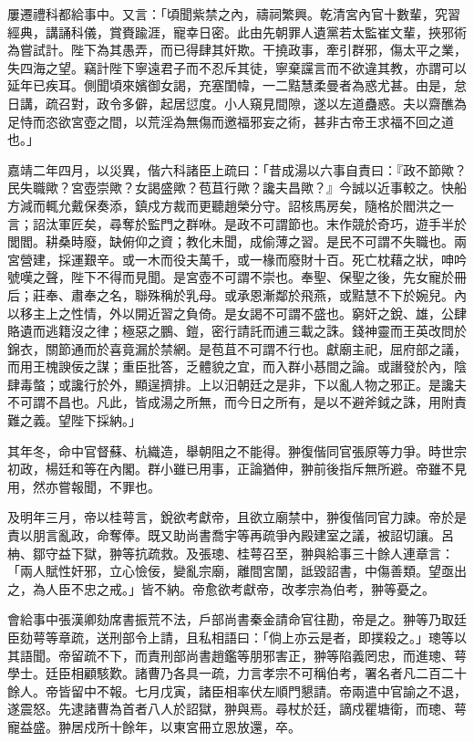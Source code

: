 \begin{pinyinscope}
屢遷禮科都給事中。又言：「頃聞紫禁之內，禱祠繁興。乾清宮內官十數輩，究習經典，講誦科儀，賞賚踰涯，寵幸日密。此由先朝罪人遺黨若太監崔文輩，挾邪術為嘗試計。陛下為其愚弄，而已得肆其奸欺。干撓政事，牽引群邪，傷太平之業，失四海之望。竊計陛下寧遠君子而不忍斥其徒，寧棄讜言而不欲違其教，亦謂可以延年已疾耳。側聞頃來嬪御女謁，充塞閨幃，一二黠慧柔曼者為惑尤甚。由是，怠日講，疏召對，政令多僻，起居愆度。小人窺見間隙，遂以左道蠱惑。夫以齋醮為足恃而恣欲宮壺之間，以荒淫為無傷而邀福邪妄之術，甚非古帝王求福不回之道也。」

嘉靖二年四月，以災異，偕六科諸臣上疏曰：「昔成湯以六事自責曰：『政不節歟？民失職歟？宮壺崇歟？女謁盛歟？苞苴行歟？讒夫昌歟？』今誠以近事較之。快船方減而輒允戴保奏添，鎮戍方裁而更聽趙榮分守。詔核馬房矣，隨格於閻洪之一言；詔汰軍匠矣，尋奪於監門之群咻。是政不可謂節也。末作競於奇巧，遊手半於閭閻。耕桑時廢，缺俯仰之資；教化未聞，成偷薄之習。是民不可謂不失職也。兩宮營建，採運艱辛。或一木而役夫萬千，或一椽而廢財十百。死亡枕藉之狀，呻吟號嘆之聲，陛下不得而見聞。是宮壺不可謂不崇也。奉聖、保聖之後，先女寵於冊后；莊奉、肅奉之名，聯殊稱於乳母。或承恩漸鄰於飛燕，或黠慧不下於婉兒。內以移主上之性情，外以開近習之負倚。是女謁不可謂不盛也。窮奸之銳、雄，公肆賂遺而逃籍沒之律；極惡之鵬、鎧，密行請託而逋三載之誅。錢神靈而王英改問於錦衣，關節通而於喜竟漏於禁網。是苞苴不可謂不行也。獻廟主祀，屈府部之議，而用王槐諛佞之謀；重臣批答，乏體貌之宜，而入群小惎間之論。或譖發於內，陰肆毒螫；或讒行於外，顯逞擠排。上以汨朝廷之是非，下以亂人物之邪正。是讒夫不可謂不昌也。凡此，皆成湯之所無，而今日之所有，是以不避斧鉞之誅，用附責難之義。望陛下採納。」

其年冬，命中官督蘇、杭織造，舉朝阻之不能得。翀復偕同官張原等力爭。時世宗初政，楊廷和等在內閣。群小雖已用事，正論猶伸，翀前後指斥無所避。帝雖不見用，然亦嘗報聞，不罪也。

及明年三月，帝以桂萼言，銳欲考獻帝，且欲立廟禁中，翀復偕同官力諫。帝於是責以朋言亂政，命奪俸。既又助尚書喬宇等再疏爭內殿建室之議，被詔切讓。呂柟、鄒守益下獄，翀等抗疏救。及張璁、桂萼召至，翀與給事三十餘人連章言：「兩人賦性奸邪，立心憸佞，變亂宗廟，離間宮闈，詆毀詔書，中傷善類。望亟出之，為人臣不忠之戒。」皆不納。帝愈欲考獻帝，改孝宗為伯考，翀等憂之。

會給事中張漢卿劾席書振荒不法，戶部尚書秦金請命官往勘，帝是之。翀等乃取廷臣劾萼等章疏，送刑部令上請，且私相語曰：「倘上亦云是者，即撲殺之。」璁等以其語聞。帝留疏不下，而責刑部尚書趙鑑等朋邪害正，翀等陷義罔忠，而進璁、萼學士。廷臣相顧駭歎。諸曹乃各具一疏，力言孝宗不可稱伯考，署名者凡二百二十餘人。帝皆留中不報。七月戊寅，諸臣相率伏左順門懇請。帝兩遣中官諭之不退，遂震怒。先逮諸曹為首者八人於詔獄，翀與焉。尋杖於廷，謫戍瞿塘衛，而璁、萼寵益盛。翀居戍所十餘年，以東宮冊立恩放還，卒。


\end{pinyinscope}
